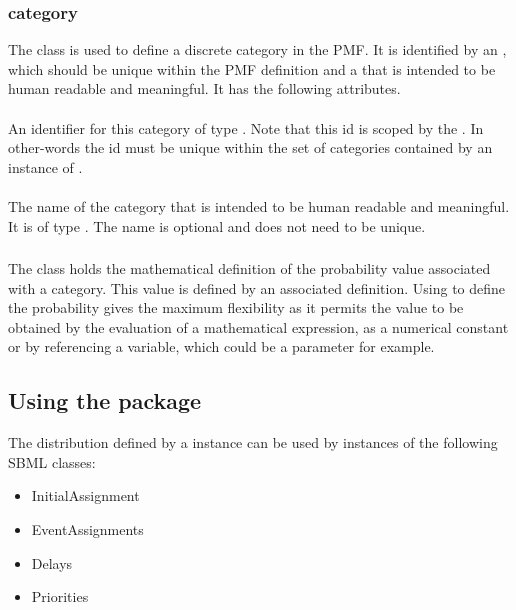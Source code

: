 \documentclass[draftspec]{sbmlpkgspec}
\begin{document}
\subsubsection{category}

The  class is used to define a discrete category in
the PMF. It is identified by an , which should be unique
within the PMF definition and a  that is intended
to be human readable and meaningful. It has the following attributes.

\paragraph{}

An identifier for this category of type . Note that this id
is scoped by the . In other-words the id must be
unique within the set of categories contained by an instance of
.

\paragraph{}

The name of the category that is intended to be human readable and
meaningful. It is of type . The name is optional and does
not need to be unique.

\subsubsection{}

The  class holds the mathematical definition of the
probability value associated with a category. This value is defined by
an associated \mathml definition. Using \mathml to define the
probability gives the maximum flexibility as it permits the value to
be obtained by the evaluation of a mathematical expression, as a
numerical constant or by referencing a variable, which could be a
parameter for example.

\subsection{Using the \distribshort package}

The distribution defined by a \FunctionDefinition instance can be
used by instances of the following SBML classes:

\begin{itemize}
  \item InitialAssignment
  \item EventAssignments
  \item Delays
  \item Priorities
\end{itemize}
\end{document}
